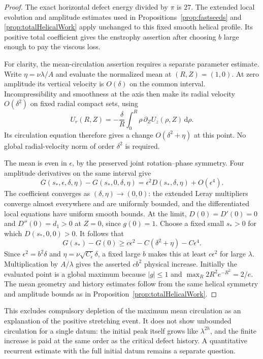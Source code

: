 \documentclass[11pt]{article}
\theoremstyle{remark}
\newcommand{\dd}{\,\mathrm d}
\begin{document}
\begin{proof}
The exact horizontal defect energy divided by $\pi$ is $27$.
The extended local evolution and amplitude estimates used in
Propositions~\ref{prop:fastseeds} and \ref{prop:totalHelicalWork}
apply unchanged to this fixed smooth helical profile.
Its positive total coefficient gives the enstrophy assertion after
choosing $b$ large enough to pay the viscous loss.

For clarity, the mean-circulation assertion requires a separate
parameter estimate. Write $\eta=\nu\lambda/A$ and evaluate the
normalized mean at $(R,Z)=(1,0)$. At zero amplitude its vertical
velocity is $O(\delta)$ on the common interval. Incompressibility
and smoothness at the axis then make its radial velocity
$O(\delta^2)$ on fixed radial compact sets, using
\[
 U_r(R,Z)=-\frac{\delta}{R}
                   \int_0^R \rho\,\partial_Z U_z(\rho,Z)\dd\rho.
\]
Its circulation equation
therefore gives a change $O(\delta^2+\eta)$ at this point.
No global radial-velocity norm of order $\delta^2$ is required.

The mean is even in $\epsilon$, by the preserved joint rotation--phase
symmetry. Four amplitude derivatives on the same interval give
\[
 G(s_*,\epsilon,\delta,\eta)-G(s_*,0,\delta,\eta)
       =\epsilon^2 D(s_*,\delta,\eta)+O(\epsilon^4).
\]
The coefficient converges as $(\delta,\eta)\to(0,0)$: the extended
Leray multipliers converge almost everywhere and are uniformly bounded,
and the differentiated local equations have uniform smooth bounds.
At the limit, $D(0)=D'(0)=0$ and $D''(0)=d_1>0$ at $Z=0$, since
$g(0)=1$. Choose a fixed small $s_*>0$ for which $D(s_*,0,0)>0$.
It follows that
\[
 G(s_*)-G(0)\geq c\epsilon^2-C(\delta^2+\eta)-C\epsilon^4.
\]
Since $\epsilon^2=b^2\delta$ and
$\eta=\nu\sqrt{C_\epsilon}\delta$, a fixed large $b$ makes this at
least $c\epsilon^2$ for large $\lambda$. Multiplication by $A/\lambda$
gives the asserted $cb^2$ physical increase. Initially the evaluated
point is a global maximum because $|g|\leq1$ and
$\max_R 2R^2e^{-R^2}=2/e$.
The mean geometry and history estimates follow from the same helical
symmetry and amplitude bounds as in Proposition~\ref{prop:totalHelicalWork}.
\end{proof}

This excludes compulsory depletion of the maximum mean circulation as
an explanation of the positive stretching event. It does not show
unbounded circulation for a single datum: the initial peak itself
grows like $\lambda^{2h}$, and the finite increase is paid at the same
order as the critical defect history. A quantitative recurrent estimate
with the full initial datum remains a separate question.
\end{document}
